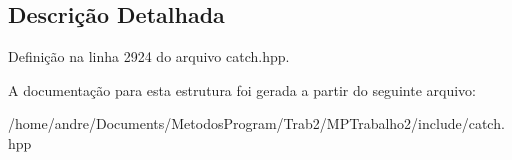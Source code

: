 \subsection{Descrição Detalhada}


Definição na linha 2924 do arquivo catch.\+hpp.



A documentação para esta estrutura foi gerada a partir do seguinte arquivo\+:\begin{DoxyCompactItemize}
\item 
/home/andre/\+Documents/\+Metodos\+Program/\+Trab2/\+M\+P\+Trabalho2/include/catch.\+hpp\end{DoxyCompactItemize}
